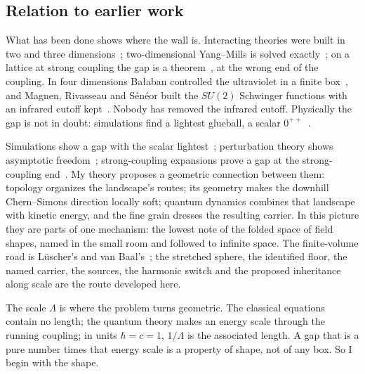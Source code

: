 \subsection*{Relation to earlier work}

What has been done shows where the wall is. Interacting theories were built in two and three
dimensions~\cite{GlimmJaffe}; two-dimensional Yang--Mills is solved exactly~\cite{Migdal75,GrossWitten80,Sengupta97,Levy03};
on a lattice at strong coupling the gap is a theorem~\cite{OsterwalderSeiler78,ShenZhuZhu23}, at the wrong end of the
coupling. In four dimensions Ba{\l}aban
controlled the ultraviolet in a finite box~\cite{Balaban}, and Magnen, Rivasseau and S\'en\'eor built the $SU(2)$
Schwinger functions with an infrared cutoff kept~\cite{MRS93}. Nobody has removed the infrared cutoff. Physically the
gap is not in doubt: simulations find a lightest glueball, a scalar $0^{++}$~\cite{MorningstarPeardon99}.

Simulations show a gap with the scalar lightest~\cite{MorningstarPeardon99};
perturbation theory shows asymptotic freedom~\cite{GrossWilczek73,Politzer73}; strong-coupling expansions prove a gap at
the strong-coupling end~\cite{OsterwalderSeiler78}. My theory proposes a geometric connection between them:
topology organizes the landscape's routes; its geometry makes the downhill Chern--Simons direction locally soft;
quantum dynamics combines that landscape with kinetic energy, and the fine grain dresses the resulting carrier.
In this picture they are parts of one mechanism: the
lowest note of the folded space of field shapes, named in the small room and followed to infinite space. The finite-volume road
is L\"uscher's and van Baal's~\cite{Luscher83,KollerVanBaal88,vanBaal00}; the stretched sphere, the identified floor, the
named carrier, the sources, the harmonic switch and the proposed inheritance along scale are the route developed here.

The scale $\Lambda$ is where the problem turns geometric. The classical equations contain no length; the quantum theory
makes an energy scale through the running coupling; in units $\hbar=c=1$, $1/\Lambda$ is the associated length.
A gap that is a pure number times that energy scale is a
property of shape, not of any box. So I begin with the shape.
